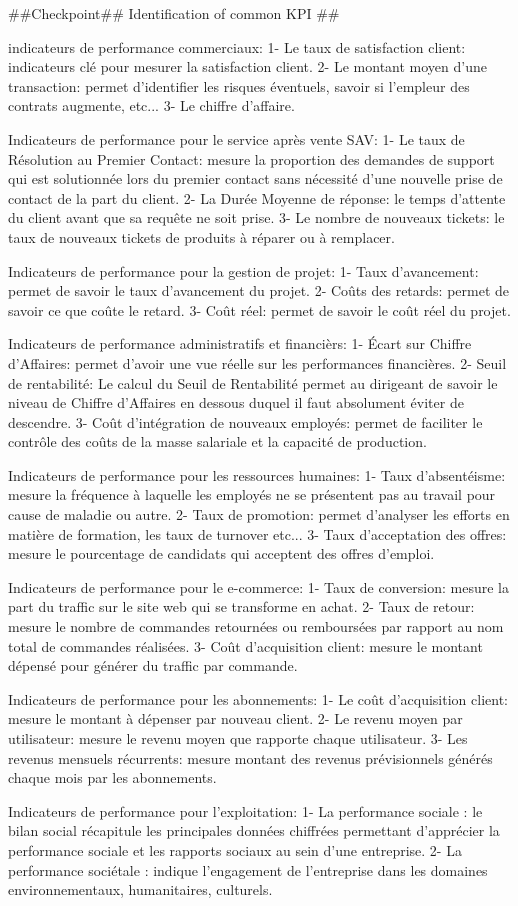##Checkpoint## Identification of common KPI ##

indicateurs de performance commerciaux:
	1- Le taux de satisfaction client: indicateurs clé pour mesurer la satisfaction client.
	2- Le montant moyen d'une transaction: permet d'identifier les risques éventuels, savoir si l'empleur des contrats augmente, etc...
	3- Le chiffre d'affaire.

Indicateurs de performance pour le service après vente SAV:
	1- Le taux de Résolution au Premier Contact: mesure la proportion des demandes de support qui est solutionnée lors du premier contact 
		sans nécessité d’une nouvelle prise de contact de la part du client.
	2- La Durée Moyenne de réponse: le temps d'attente du client avant que sa requête ne soit prise.
	3- Le nombre de nouveaux tickets: le taux de nouveaux tickets de produits à réparer ou à remplacer.

Indicateurs de performance pour la gestion de projet:
	1- Taux d'avancement: permet de savoir le taux d'avancement du projet.
	2- Coûts des retards: permet de savoir ce que coûte le retard.
	3- Coût réel: permet de savoir le coût réel du projet.

Indicateurs de performance administratifs et financièrs:
	1- Écart sur Chiffre d’Affaires: permet d'avoir une vue réelle sur les performances financières.
	2- Seuil de rentabilité: Le calcul du Seuil de Rentabilité permet au dirigeant de savoir le niveau de Chiffre d’Affaires 
		en dessous duquel il faut absolument éviter de descendre.
	3- Coût d’intégration de nouveaux employés: permet de faciliter le contrôle des coûts de la masse salariale et la capacité de production.

Indicateurs de performance pour les ressources humaines:
	1- Taux d'absentéisme: mesure la fréquence à laquelle les employés ne se présentent pas au travail pour cause de maladie ou autre.
	2- Taux de promotion: permet d'analyser les efforts en matière de formation, les taux de turnover etc...
	3- Taux d’acceptation des offres: mesure le pourcentage de candidats qui acceptent des offres d’emploi.
	
Indicateurs de performance pour le e-commerce:
	1- Taux de conversion: mesure la part du traffic sur le site web qui se transforme en achat.
	2- Taux de retour: mesure le nombre de commandes retournées ou remboursées par rapport au nom total de commandes réalisées.
	3- Coût d’acquisition client: mesure le montant dépensé pour générer du traffic par commande.

Indicateurs de performance pour les abonnements:
	1- Le coût d’acquisition client: mesure le montant à dépenser par nouveau client.
	2- Le revenu moyen par utilisateur: mesure le revenu moyen que rapporte chaque utilisateur.
	3- Les revenus mensuels récurrents: mesure montant des revenus prévisionnels générés chaque mois par les abonnements.
	
Indicateurs de performance pour l’exploitation:
	1- La performance sociale : le bilan social récapitule les principales données chiffrées permettant d'apprécier 
		la performance sociale et les rapports sociaux au sein d'une entreprise. 
	2- La performance sociétale : indique l'engagement de l'entreprise dans les domaines environnementaux, humanitaires, culturels.
